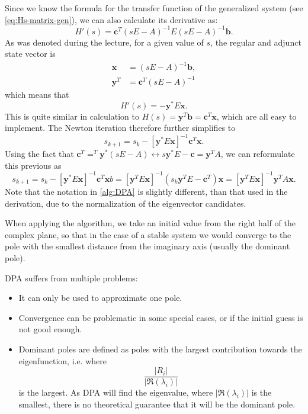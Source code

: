 \documentclass{article}
\begin{document}
	Since we know the formula for the transfer function of the generalized system (see \autoref{eq:Hs-matrix-gen}), we can also calculate its derivative as:
	\begin{equation}
		H'(s) = \textbf{c}^T \left(sE - A\right)^{-1} E \left(sE - A\right)^{-1} \textbf{b}.
	\end{equation}
	As was denoted during the lecture, for a given value of $s$, the regular and adjunct state vector is 
	\begin{align}
		\textbf{x} &= \left(sE - A\right)^{-1} \textbf{b},\\
		\textbf{y}^T &= \textbf{c}^T \left(sE - A\right)^{-1}
	\end{align}
	which means that 
	\begin{equation}
		H'(s) = -\textbf{y}^\ast  E \textbf{x}.
	\end{equation}
	This is quite similar in calculation to $H(s) = \textbf{y}^T\textbf{b} = \textbf{c}^T \textbf{x}$, which are all easy to implement. The Newton iteration therefore further simplifies to 
	\begin{equation}
		s_{k+1}  = s_{k} - \left[\textbf{y}^\ast E \textbf{x}\right]^{-1} \textbf{c}^T \textbf{x}.
	\end{equation}
	Using the fact that $\textbf{c}^T =^T \textbf{y}^\ast \left(sE - A\right)  \leftrightarrow s \textbf{y}^\ast E - \textbf{c} = \textbf{y}^T A$, we can reformulate this previous as 
	\begin{equation}
		s_{k+1}  = s_{k} - \left[\textbf{y}^\ast E \textbf{x}\right]^{-1} \textbf{c}^T \textbf{x} b = \left[\textbf{y}^T E \textbf{x}\right]^{-1} \left(s_k \textbf{y}^T E - \textbf{c}^T\right)\textbf{x} = \left[\textbf{y}^T E \textbf{x}\right]^{-1} \textbf{y}^T A\textbf{x}.
	\end{equation}
	Note that the notation in \autoref{alg:DPA} is slightly different, than that used in the derivation, due to the normalization of the eigenvector candidates. 
	
	When applying the algorithm, we take an initial value from the right half of the complex plane, so that in the case of a stable system we would converge to the pole with the smallest distance from the imaginary axis (usually the dominant pole).
	
	DPA suffers from multiple problems:
	\begin{itemize}
		\item It can only be used to approximate one pole.
		\item Convergence can be problematic in some special cases, or if the initial guess is not good enough.
		\item Dominant poles are defined as poles with the largest contribution towards the eigenfunction, i.e. where 
		\begin{equation*}
			\frac{\left|R_i\right|}{\left|\Re\left(\lambda_i\right)\right|}
		\end{equation*}
		is the largest. As DPA will find the eigenvalue, where $\left|\Re\left(\lambda_i\right)\right|$ is the smallest, there is no theoretical guarantee that it will be the dominant pole.
	\end{itemize}
	
\end{document}
